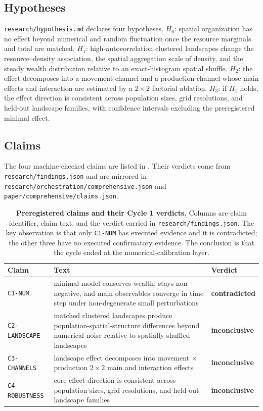 \documentclass[11pt,a4paper]{article}
\newcommand{\code}[1]{\texttt{#1}}
\begin{document}
\subsection{Hypotheses}

\code{research/hypothesis.md} declares four hypotheses. $H_0$: spatial
organization has no effect beyond numerical and random fluctuation once the
resource marginals and total are matched. $H_1$: high-autocorrelation clustered
landscapes change the resource--density association, the spatial aggregation
scale of density, and the steady wealth distribution relative to an
exact-histogram spatial shuffle. $H_2$: the effect decomposes into a movement
channel and a production channel whose main effects and interaction are
estimated by a $2\times2$ factorial ablation. $H_3$: if $H_1$ holds, the effect
direction is consistent across population sizes, grid resolutions, and
held-out landscape families, with confidence intervals excluding the
preregistered minimal effect.

\subsection{Claims}

The four machine-checked claims are listed in . Their verdicts
come from \code{research/findings.json} and are mirrored in
\code{research/orchestration/comprehensive.json} and
\code{paper/comprehensive/claims.json}.

\begin{table}[htbp]
\centering
\begin{tabular}{@{}lp{6.4cm}p{2.0cm}@{}}
\toprule
\textbf{Claim} & \textbf{Text} & \textbf{Verdict} \\
\midrule
\code{C1-NUM} & minimal model conserves wealth, stays non-negative, and main observables converge in time step under non-degenerate small perturbations & \textbf{contradicted} \\
\code{C2-LANDSCAPE} & matched clustered landscapes produce population-spatial-structure differences beyond numerical noise relative to spatially shuffled landscapes & \textbf{inconclusive} \\
\code{C3-CHANNELS} & landscape effect decomposes into movement $\times$ production $2\times2$ main and interaction effects & \textbf{inconclusive} \\
\code{C4-ROBUSTNESS} & core effect direction is consistent across population sizes, grid resolutions, and held-out landscape families & \textbf{inconclusive} \\
\bottomrule
\end{tabular}
\caption{\textbf{Preregistered claims and their Cycle 1 verdicts.} Columns are
claim identifier, claim text, and the verdict carried in
\code{research/findings.json}. The key observation is that only
\code{C1-NUM} has executed evidence and it is contradicted; the other three
have no executed confirmatory evidence. The conclusion is that the cycle ended
at the numerical-calibration layer.}
\label{tab:claims}
\end{table}
\end{document}
